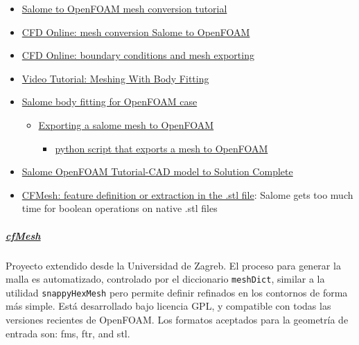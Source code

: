 \begin{itemize}
\item
  \href{http://staff.um.edu.mt/__data/assets/pdf_file/0016/106144/Salome_to_OpenFOAM.pdf}{Salome
  to OpenFOAM mesh conversion tutorial}
\item
  \href{http://www.cfd-online.com/Forums/openfoam-meshing-open/73971-mesh-conversion-salome-openfoam.html}{CFD
  Online: mesh conversion Salome to OpenFOAM}
\item
  \href{http://www.cfd-online.com/Forums/openfoam-meshing-open/76222-boundary-conditions-mesh-exporting.html}{CFD
  Online: boundary conditions and mesh exporting}
\item
  \href{https://www.youtube.com/watch?v=4xmSjjoioxI}{Video Tutorial:
  Meshing With Body Fitting}
\item
  \href{https://www.cfd-online.com/Forums/openfoam-meshing/142435-salome-body-fitting-openfoam-case.html}{Salome
  body fitting for OpenFOAM case}

  \begin{itemize}
  \item
    \href{http://www.salome-platform.org/forum/forum_12/23863165\#686106}{Exporting
    a salome mesh to OpenFOAM}

    \begin{itemize}
    \item
      \href{https://github.com/nicolasedh/salomeToOpenFOAM}{python
      script that exports a mesh to OpenFOAM}
    \end{itemize}
  \end{itemize}
\item
  \href{https://www.youtube.com/watch?v=1zQbU-E4k1U}{Salome OpenFOAM
  Tutorial-CAD model to Solution Complete}
\item
  \href{https://www.cfd-online.com/Forums/openfoam-meshing-snappyhexmesh/142250-cfmesh-feature-definition-extraction-stl-file.html}{CFMesh:
  feature definition or extraction in the .stl file}: Salome gets too
  much time for boolean operations on native .stl files
\end{itemize}

\subparagraph{\texorpdfstring{
\href{http://www.c-fields.com/cfmesh}{cfMesh}}{cfMesh}}\label{header-n242}

Proyecto extendido desde la Universidad de Zagreb. El proceso para
generar la malla es automatizado, controlado por el diccionario
\texttt{meshDict}, similar a la utilidad \texttt{snappyHexMesh} pero
permite definir refinados en los contornos de forma más simple. Está
desarrollado bajo licencia GPL, y compatible con todas las versiones
recientes de OpenFOAM. Los formatos aceptados para la geometría de
entrada son: fms, ftr, and stl.

